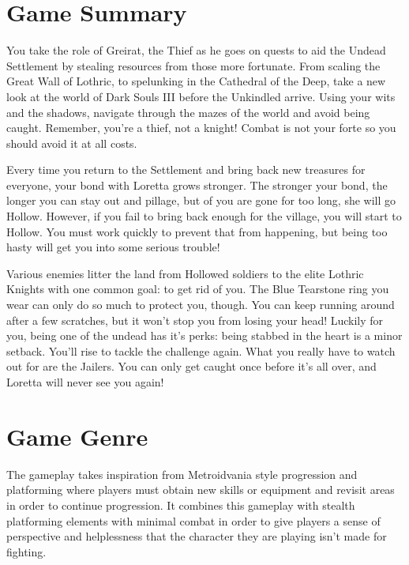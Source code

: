 \documentclass[11pt,fleqn]{book} %
\begin{document}
\section{Game Summary}

\quad You take the role of Greirat, the Thief as he goes on quests to aid the Undead Settlement by stealing resources from those more fortunate. From scaling the Great Wall of Lothric, to spelunking in the Cathedral of the Deep, take a new look at the world of Dark Souls III before the Unkindled arrive. Using your wits and the shadows, navigate through the mazes of the world and avoid being caught. Remember, you're a thief, not a knight! Combat is not your forte so you should avoid it at all costs.

\quad Every time you return to the Settlement and bring back new treasures for everyone, your bond with Loretta grows stronger.  The stronger your bond, the longer you can stay out and pillage, but of you are gone for too long, she will go Hollow.  However, if you fail to bring back enough for the village, you will start to Hollow. You must work quickly to prevent that from happening, but being too hasty will get you into some serious trouble!
	
\quad Various enemies litter the land from Hollowed soldiers to the elite Lothric Knights with one common goal: to get rid of you. The Blue Tearstone ring you wear can only do so much to protect you, though. You can keep running around after a few scratches, but it won't stop you from losing your head! Luckily for you, being one of the undead has it's perks: being stabbed in the heart is a minor setback. You'll rise to tackle the challenge again. What you really have to watch out for are the Jailers. You can only get caught once before it's all over, and Loretta will never see you again!

\section{Game Genre}

The gameplay takes inspiration from Metroidvania style progression and platforming where players must obtain new skills or equipment and revisit areas in order to continue progression. It combines this gameplay with stealth platforming elements with minimal combat in order to give players a sense of perspective and helplessness that the character they are playing isn't made for fighting.
\end{document}
